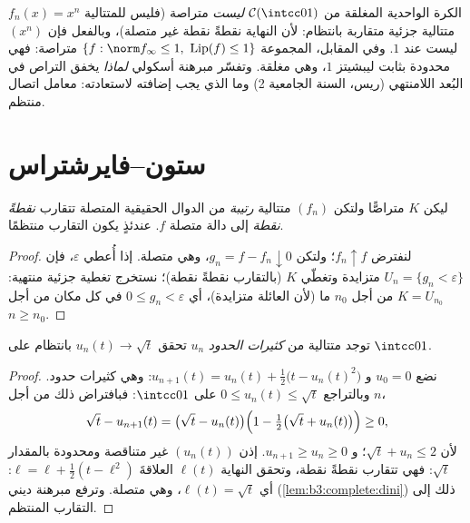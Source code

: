 \begin{example}\label{ex:b3:complete:ascoliexamples}
الكرة الواحدية المغلقة من $\mathcal C(\intcc01)$ \emph{ليست} متراصة (فليس
للمتتالية $f_n(x) = x^n$ متتالية جزئية متقاربة بانتظام: لأن النهاية
نقطةً نقطة غير متصلة)، وبالفعل فإن $(x^n)$ ليست 
عند $1$. وفي المقابل، المجموعة $\{f : \norm
f_\infty \leq 1,\ \operatorname{Lip}(f) \leq 1\}$ متراصة: فهي محدودة
 بثابت ليبشيتز $1$، وهي مغلقة. وتفسّر مبرهنة
أسكولي \emph{لماذا} يخفق التراص في البُعد اللامنتهي (ريس، السنة
الجامعية 2) وما الذي يجب إضافته لاستعادته: معامل اتصال منتظم.
\end{example}

\section{ستون--فايرشتراس}

\begin{lemma}[ديني]\label{lem:b3:complete:dini}
ليكن $K$ متراصًّا ولتكن $(f_n)$ متتالية \emph{رتيبة} من الدوال
الحقيقية المتصلة تتقارب \emph{نقطةً نقطة} إلى دالة متصلة $f$.
عندئذٍ يكون التقارب منتظمًا.
\end{lemma}

\begin{proof}
لنفترض $f_n \uparrow f$؛ ولتكن $g_n = f - f_n \downarrow 0$، وهي متصلة. إذا أُعطي
$\varepsilon$، فإن  $U_n = \{g_n <
\varepsilon\}$ متزايدة وتغطّي
$K$ (بالتقارب نقطةً نقطة)؛ نستخرج تغطية جزئية منتهية:
$K = U_{n_0}$ من أجل $n_0$ ما (لأن العائلة متزايدة)، أي $0 \leq g_n < \varepsilon$
في كل مكان من أجل $n \geq n_0$.
\end{proof}

\begin{lemma}\label{lem:b3:complete:sqrt}
توجد متتالية من \emph{كثيرات الحدود} $u_n$ تحقق $u_n(t) \to
\sqrt t$ بانتظام
على $\intcc01$.
\end{lemma}

\begin{proof}
نضع $u_0 = 0$ و $u_{n+1}(t) = u_n(t) + \frac12\bigl(t -
u_n(t)^2\bigr)$: وهي كثيرات حدود. وبالتراجع $0 \leq u_n(t) \leq
\sqrt t$ على
$\intcc01$: فبافتراض ذلك من أجل $n$،
\[
\sqrt t - u_{n+1}(t) = \bigl(\sqrt t - u_n(t)\bigr)
\Bigl(1 - \tfrac12\bigl(\sqrt t + u_n(t)\bigr)\Bigr) \geq 0,
\]
لأن $\sqrt t + u_n \leq 2$؛ و $u_{n+1} \geq u_n \geq 0$. إذن $(u_n(t))$ غير متناقصة ومحدودة
بالمقدار $\sqrt t$: فهي تتقارب نقطةً نقطة، وتحقق النهاية $\ell(t)$
العلاقةَ $\ell =
\ell + \frac12(t - \ell^2)$: أي $\ell(t) = \sqrt t$، وهي متصلة. وترفع مبرهنة ديني
(\cref{lem:b3:complete:dini}) ذلك إلى التقارب المنتظم.
\end{proof}

